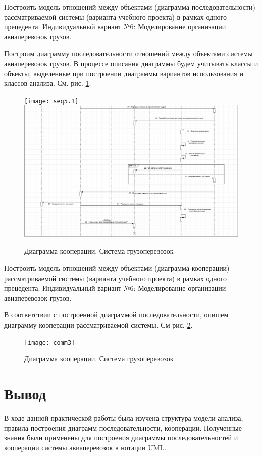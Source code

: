 \documentclass[a4paper,14pt]{extarticle}
\begin{document}
\begin{problem}
	Построить модель отношений между объектами (диаграмма последовательности) рассматриваемой системы (варианта учебного проекта) в рамках одного прецедента. Индивидуальный вариант №6: Моделирование организации авиаперевозок грузов.
\end{problem}

\begin{nonum}
	Построим диаграмму последовательности отношений между объектами системы авиаперевозок грузов. В процессе описания диаграммы будем учитывать классы и объекты, выделенные при построении диаграммы вариантов использования и классов анализа. См. рис. \ref{img:seqd2}.
\begin{figure}[h!]
	\centering
	\texttt{[image: seq5.1]}
	\includegraphics[width=0.8\linewidth]{seq5.2}
	\caption{Диаграмма кооперации. Система грузоперевозок}
	\label{img:seqd2}
\end{figure}
\end{nonum}

\begin{problem}
	Построить модель отношений между объектами (диаграмма кооперации) рассматриваемой системы (варианта учебного проекта) в рамках одного прецедента.  Индивидуальный вариант №6: Моделирование организации авиаперевозок грузов.
\end{problem}
\begin{nonum}
	В соответствии с построенной диаграммой последовательности, опишем диаграмму кооперации рассматриваемой системы. См рис. \ref{img:comd2}.
\begin{figure}[htbp]
	\centering
	\texttt{[image: comm3]}
	\caption{Диаграмма кооперации. Система грузоперевозок}
	\label{img:comd2}
\end{figure}	
\end{nonum}

\section{Вывод}
В ходе данной практической работы была изучена структура модели анализа, правила построения диаграмм последовательности, кооперации. Полученные знания были применены для построения диаграммы последовательностей и кооперации системы авиаперевозок в нотации UML. 
	
\end{document}
